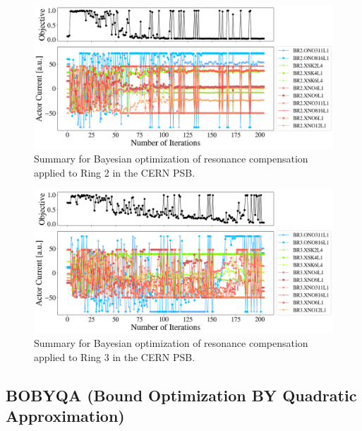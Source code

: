 \begin{figure}[H]
    \centering
    \includegraphics[width=\linewidth]{chapter5/2023_05_02_R2_LHCramp_BayesOpt.png}
    \caption{Summary for Bayesian optimization of resonance compensation applied to Ring 2 in the CERN PSB.}
    \label{fig:bo1}
\end{figure}

\begin{figure}[H]
    \centering
    \includegraphics[width=\linewidth]{chapter5/2023_05_02_R3_LHCramp_BayesOpt.png}
    \caption{Summary for Bayesian optimization of resonance compensation applied to Ring 3 in the CERN PSB.}
    \label{fig:bo2}
\end{figure}

\subsection{BOBYQA (Bound Optimization BY Quadratic Approximation)}

